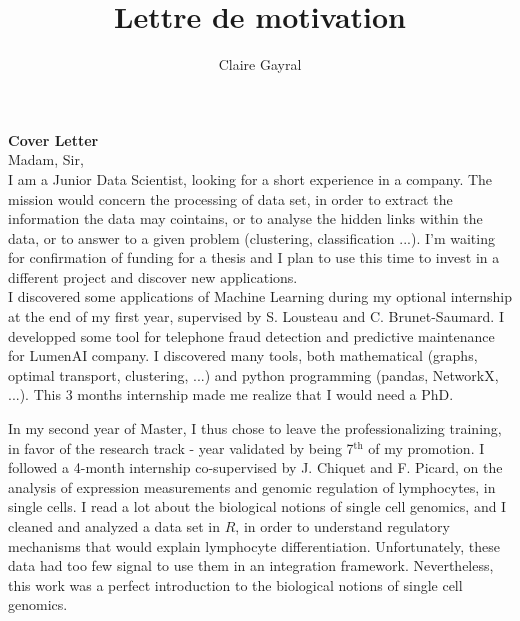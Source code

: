 \documentclass[a4paper,12pt]{article}
\title{Lettre de motivation}
\author{Claire Gayral}
\date{}
\begin{document}
{\centering \Large \bf Cover Letter  \\ \vspace{0.6cm} }
Madam, Sir, 
\\

I am a Junior Data Scientist, looking for a short experience in a company. The mission would concern the processing of data set, in order to extract the information the data may cointains, or to analyse the hidden links within the data, or to answer to a given problem (clustering, classification ...). 
I'm waiting for confirmation of funding for a thesis and I plan to use this time to invest in a different project and discover new applications. \\

I discovered some applications of Machine Learning during my optional internship at the end of my first year, supervised by S. Lousteau and C. Brunet-Saumard.
I developped some tool for telephone fraud detection and predictive maintenance for LumenAI company.  I discovered many tools, both mathematical (graphs, optimal transport, clustering, ...) and python programming (pandas, NetworkX, ...). 
This 3 months internship made me realize that I would need a PhD. 

In my second year of Master, I thus chose to leave the professionalizing training, in favor of the research track - year validated by being 7$^{\text{th}}$ of my promotion. 
I followed a 4-month internship co-supervised by J. Chiquet and F. Picard, on the analysis of expression measurements and genomic regulation of lymphocytes, in single cells. I read a lot about the biological notions of single cell genomics, and I cleaned and analyzed a data set in $R$, in order to understand regulatory mechanisms that would explain lymphocyte differentiation. Unfortunately, these data had too few signal to use them in an integration framework. Nevertheless, this work was a perfect introduction to the biological notions of single cell genomics.
\end{document}
